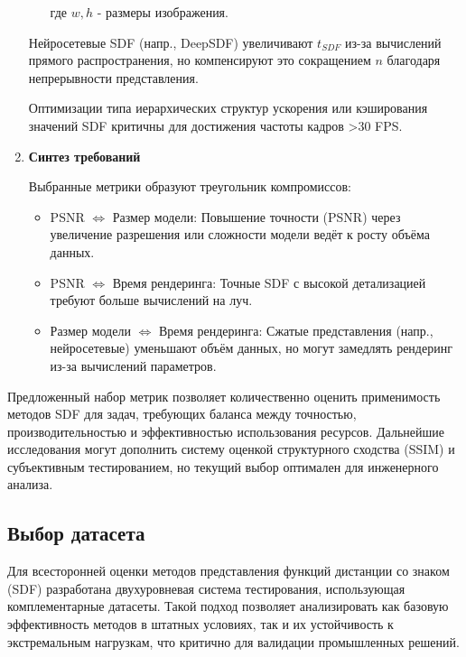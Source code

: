 \documentclass[a4paper,hidelinks,12pt]{article}
\begin{document}
\begin{enumerate}
\begin{itemize}
		где $w, h$ - размеры изображения.
	\end{itemize}

	Нейросетевые SDF (напр., DeepSDF) увеличивают $ t_{SDF} $ из-за вычислений прямого распространения, 
	но компенсируют это сокращением $ n $ благодаря непрерывности представления. 

	Оптимизации типа иерархических структур ускорения или кэширования значений SDF критичны для достижения частоты кадров >30 FPS.

	\item \textbf{Синтез требований}
	\par
	Выбранные метрики образуют треугольник компромиссов:
	\begin{itemize}
		\item PSNR $\Leftrightarrow $ Размер модели: Повышение точности (PSNR) через увеличение разрешения или сложности модели ведёт к росту объёма данных.
		\item PSNR $\Leftrightarrow $ Время рендеринга: Точные SDF с высокой детализацией требуют больше вычислений на луч.
		\item Размер модели $\Leftrightarrow $ Время рендеринга: Сжатые представления (напр., нейросетевые) уменьшают объём данных, но могут замедлять рендеринг из-за вычислений параметров.
	\end{itemize}
\end{enumerate}

\par
Предложенный набор метрик позволяет количественно оценить применимость методов SDF для задач, требующих баланса между точностью, производительностью и эффективностью использования ресурсов. Дальнейшие исследования могут дополнить систему оценкой структурного сходства (SSIM) и субъективным тестированием, но текущий выбор оптимален для инженерного анализа.

\newpage

\subsection{Выбор датасета}

Для всесторонней оценки методов представления функций дистанции со знаком (SDF) разработана двухуровневая система 
тестирования, использующая комплементарные датасеты. Такой подход позволяет анализировать как базовую эффективность 
методов в штатных условиях, так и их устойчивость к экстремальным нагрузкам, что критично для валидации промышленных решений.
\end{document}
